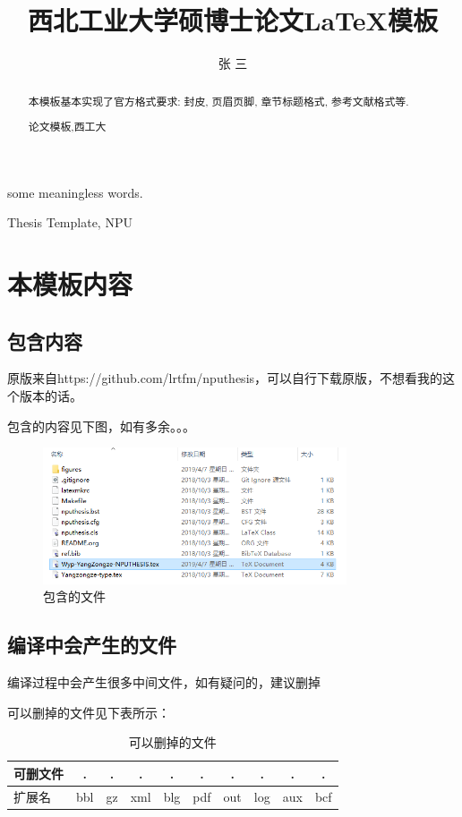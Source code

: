 \documentclass[twoside, workbib, UTF8, phd]{nputhesis}
\title[\LaTeX\ Template for Thesis of NPU]{西北工业大学硕博士论文\LaTeX 模板}
\author[San Zhang]{张\,\,三}
\begin{document}
\makecover    %
\frontmatter  %

\begin{abstract}
  本模板基本实现了官方格式要求: 封皮, 页眉页脚, 章节标题格式, 参考文献格式等.
  \begin{keywords}
    论文模板,西工大
  \end{keywords}
\end{abstract}

\begin{Abstract}
   some meaningless words.
  \begin{Keywords}
    Thesis Template, NPU
  \end{Keywords}
\end{Abstract}

\tableofcontents    %
\printnomenclature  %
\mainmatter         %

\chapter{本模板内容}

\section{包含内容}
原版来自https://github.com/lrtfm/nputhesis，可以自行下载原版，不想看我的这个版本的话。\par\par
包含的内容见下图，如有多余。。。
\begin{figure}[htbp]
    \centering
    \includegraphics[width=0.8\textwidth]{figures/fig-files.png}
    \caption{包含的文件}
\end{figure}

\section{编译中会产生的文件}
编译过程中会产生很多中间文件，如有疑问的，建议删掉\par
可以删掉的文件见下表所示：
\begin{table}[htbp]
    \setlength{\abovecaptionskip}{10pt}
    \setlength{\belowcaptionskip}{5pt}
    \small
    \centering
     \caption{可以删掉的文件}
  \begin{tabular*}{\hsize}{@{}@{\extracolsep{\fill}}lccccccccc@{}}
    \toprule[2pt]
     可删文件 & .& .& .& .& .& .& .& .& . \\
    \midrule[1pt]
    扩展名 &bbl&gz&xml&blg&pdf&out&log&aux&bcf\\
    \bottomrule[2pt]
  \end{tabular*}
\end{table}
\end{document}
